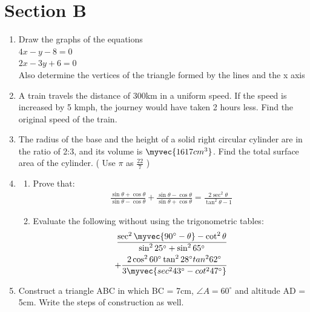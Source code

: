 \documentclass[journal,12pt,twocolumn]{IEEEtran}
\renewcommand\thesection{\arabic{section}}
\begin{document}
\section{Section B}
\renewcommand{\theequation}{\theenumi}
\begin{enumerate}[label=\thesection.\arabic*.,ref=\thesection.\theenumi]
\item Draw the graphs of the equations\\
$ 4x - y - 8 = 0 $\\
$ 2x - 3y + 6 = 0 $\\
Also determine the vertices of the triangle formed by the lines and the
x axis\\
\item A train travels the distance of 300km in a uniform speed. If the speed
is increased by 5 kmph, the journey would have taken 2 hours less. Find the 
original speed of the train.\\
\item The radius of the base and the height of a solid right circular cylinder
are in the ratio of 2:3, and its volume is $\myvec{1617 cm^3}$. Find the total 
surface area of the cylinder. ( Use $\pi$  as  $\frac{22}{7} $ )\\
\item 
\begin{enumerate}
    \item  Prove that:\\
     \begin{align}
       \frac{\sin{\theta} + \cos{\theta}}{\sin{\theta} - \cos{\theta}}  + \frac{\sin{\theta} - \cos{\theta}}{\sin{\theta} + \cos{\theta}} = \frac{2 \sec^2 \theta}{\tan^2 \theta - 1} \nonumber
     \end{align}
     \item Evaluate the following without using the trigonometric tables:
     \begin{align}
     \frac{\sec^2\myvec{90^\circ - \theta} - \cot^2\theta}{\sin^2 25^\circ + \sin^2 65^\circ}
     \nonumber \\ + \frac{2\cos^2 60^\circ \tan^2 28^\circ tan^2 62^\circ}{3\myvec{sec^2 43^\circ - cot^2 47^\circ}} \nonumber
     \end{align}
\end{enumerate}

\item Construct a triangle ABC in which BC = 7cm, $\angle{A} = 60^\circ $  and altitude AD = 5cm. Write the steps of construction as well.\\


\end{enumerate}
\end{document}

